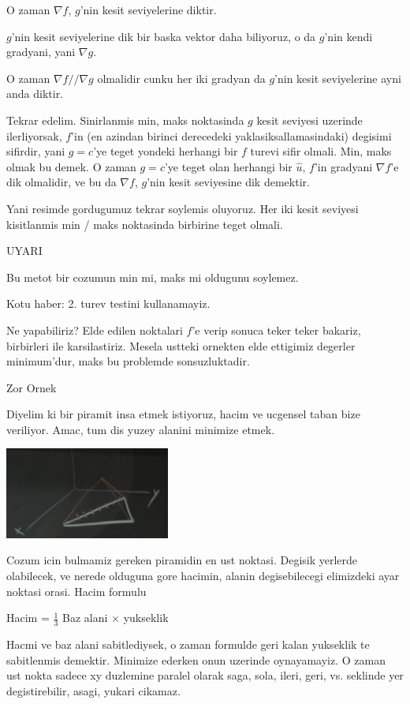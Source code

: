 \documentclass[12pt,fleqn]{article}
\begin{document}
O zaman $\nabla f$, $g$'nin kesit seviyelerine diktir. 

$g$'nin kesit seviyelerine dik bir baska vektor daha biliyoruz, o 
da $g$'nin kendi gradyani, yani $\nabla g$. 

O zaman $\nabla f // \nabla g$ olmalidir cunku her iki gradyan da $g$'nin
kesit seviyelerine ayni anda diktir. 

Tekrar edelim. Sinirlanmis min, maks noktasinda $g$ kesit seviyesi uzerinde
ilerliyorsak, $f$'in (en azindan birinci derecedeki yaklasiksallamasindaki)
degisimi sifirdir, yani $g=c$'ye teget yondeki herhangi bir $f$ turevi sifir
olmali. Min, maks olmak bu demek. O zaman $g=c$'ye teget olan herhangi bir
$\hat{u}$, $f$'in gradyani $\nabla f$'e dik olmalidir, ve bu da $\nabla f$,
$g$'nin kesit seviyesine dik demektir. 

Yani resimde gordugumuz tekrar soylemis oluyoruz. Her iki kesit seviyesi
kisitlanmis min / maks noktasinda birbirine teget olmali.

UYARI

Bu metot bir cozumun min mi, maks mi oldugunu soylemez. 

Kotu haber: 2. turev testini kullanamayiz. 

Ne yapabiliriz? Elde edilen noktalari $f$'e verip sonuca teker teker
bakariz, birbirleri ile karsilastiriz. Mesela ustteki ornekten elde
ettigimiz degerler minimum'dur, maks bu problemde sonsuzluktadir.

Zor Ornek

Diyelim ki bir piramit insa etmek istiyoruz, hacim ve ucgensel taban bize
veriliyor. Amac, tum dis yuzey alanini minimize etmek. 

\includegraphics[height=3cm]{13_8.png}

Cozum icin bulmamiz gereken piramidin en ust noktasi. Degisik yerlerde
olabilecek, ve nerede olduguna gore hacimin, alanin degisebilecegi
elimizdeki ayar noktasi orasi. Hacim formulu

Hacim = $\frac{1}{3}$ Baz alani $\times$ yukseklik

Hacmi ve baz alani sabitlediysek, o zaman formulde geri kalan yukseklik te
sabitlenmis demektir. Minimize ederken onun uzerinde oynayamayiz. O zaman
ust nokta sadece xy duzlemine paralel olarak saga, sola, ileri, geri,
vs. seklinde yer degistirebilir, asagi, yukari cikamaz. 
\end{document}

